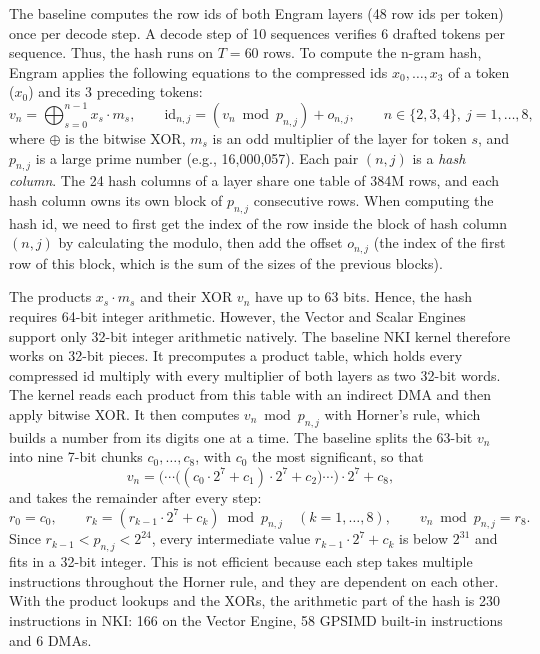 \documentclass{article}
\begin{document}
The baseline computes the row ids of both Engram layers (48 row ids per token) once per decode step. A decode step of 10 sequences verifies 6 drafted tokens per sequence. Thus, the hash runs on $T = 60$ rows. To compute the n-gram hash, Engram applies the following equations to the compressed ids $x_0, \dots, x_3$ of a token ($x_0$) and its 3 preceding tokens:
\[
  v_n = \bigoplus_{s=0}^{n-1} x_s \cdot m_s, \qquad
  \mathrm{id}_{n,j} = (v_n \bmod p_{n,j}) + o_{n,j}, \qquad n \in \{2, 3, 4\},\ j = 1, \dots, 8,
\]
where $\oplus$ is the bitwise XOR, $m_s$ is an odd multiplier of the layer for token $s$, and $p_{n,j}$ is a large prime number (e.g., 16,000,057). Each pair $(n, j)$ is a \emph{hash column}. The 24 hash columns of a layer share one table of 384M rows, and each hash column owns its own block of $p_{n,j}$ consecutive rows. When computing the hash id, we need to first get the index of the row inside the block of hash column $(n, j)$ by calculating the modulo, then add the offset $o_{n,j}$ (the index of the first row of this block, which is the sum of the sizes of the previous blocks).

The products $x_s \cdot m_s$ and their XOR $v_n$ have up to 63 bits. Hence, the hash requires 64-bit integer arithmetic. However, the Vector and Scalar Engines support only 32-bit integer arithmetic natively. The baseline NKI kernel therefore works on 32-bit pieces. It precomputes a product table, which holds every compressed id multiply with every multiplier of both layers as two 32-bit words. The kernel reads each product from this table with an indirect DMA and then apply bitwise XOR. It then computes $v_n \bmod p_{n,j}$ with Horner's rule, which builds a number from its digits one at a time. The baseline splits the 63-bit $v_n$ into nine 7-bit chunks $c_0, \dots, c_8$, with $c_0$ the most significant, so that
\[
  v_n = \big(\cdots\big((c_0 \cdot 2^7 + c_1) \cdot 2^7 + c_2\big) \cdots\big) \cdot 2^7 + c_8 ,
\]
and takes the remainder after every step:
\[
  r_0 = c_0, \qquad r_k = (r_{k-1} \cdot 2^7 + c_k) \bmod p_{n,j} \quad (k = 1, \dots, 8), \qquad v_n \bmod p_{n,j} = r_8 .
\]
Since $r_{k-1} < p_{n,j} < 2^{24}$, every intermediate value $r_{k-1} \cdot 2^7 + c_k$ is below $2^{31}$ and fits in a 32-bit integer. This is not efficient because each step takes multiple instructions throughout the Horner rule, and they are dependent on each other. With the product lookups and the XORs, the arithmetic part of the hash is 230 instructions in NKI: 166 on the Vector Engine, 58 GPSIMD built-in instructions and 6 DMAs. 
\end{document}
